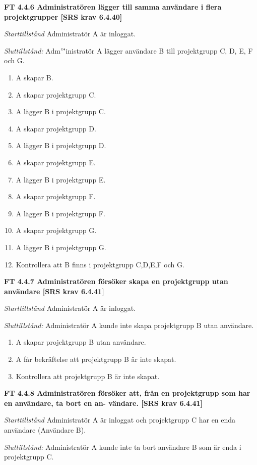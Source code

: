 \documentclass[a4paper]{article}
\begin{document}
\textbf{FT 4.4.6 Administratören lägger till samma användare i flera projektgrupper [SRS krav 6.4.40]}

\emph{Starttillstånd} Administratör A är inloggat.

\emph{Sluttillstånd:} Adm''\''inistratör A lägger användare B till   projektgrupp C, D, E, F och G.

\begin{enumerate}
\item A skapar B.
\item A skapar projektgrupp C.
\item A lägger B i projektgrupp C.
\item A skapar projektgrupp D.
\item A lägger B i projektgrupp D.
\item A skapar projektgrupp E.
\item A lägger B i projektgrupp E.
\item A skapar projektgrupp F.
\item A lägger B i projektgrupp F.
\item A skapar projektgrupp G.
\item A lägger B i projektgrupp G.
\item Kontrollera att B finns i projektgrupp C,D,E,F och G.

\end{enumerate}

\textbf{FT 4.4.7 Administratören försöker skapa en projektgrupp utan användare [SRS krav 6.4.41]}

\emph{Starttillstånd} Administratör A är inloggat.

\emph{Sluttillstånd:} Administratör A kunde inte skapa  projektgrupp B utan användare.

\begin{enumerate}
\item A skapar projektgrupp B utan användare.
\item A får bekräftelse att projektgrupp B är inte skapat.
\item Kontrollera att projektgrupp B är inte skapat.
\end{enumerate}

\textbf{FT 4.4.8 Administratören försöker att, från en projektgrupp som har en användare, ta bort en an- vändare. [SRS krav 6.4.41]}

\emph{Starttillstånd} Administratör A är inloggat och projektgrupp C har en enda användare (Användare B).

\emph{Sluttillstånd:} Administratör A kunde inte ta bort användare B som är enda i  projektgrupp C.
\end{document}
